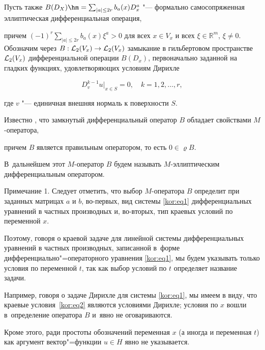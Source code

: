 \begin{enumerate}
Пусть также $B(D_X)\hm =\sum_{|a|\le2r} b_a(x)D_x^a $ "--- формально самосопряженная эллиптическая дифференциальная операция, 

причем $(-1)^r\sum_{|a|\le2r}{b_a(x)\xi^a}>0$ для всех ${x\in V_x}$ и всех ${\xi\in\mathbb{R}^m}$, $\xi\ne0$. Обозначим через $B:{\cal L}_2(V_x)\to{\cal L}_2(V_x)$ замыкание в гильбертовом пространстве ${\cal L}_2(V_x)$ дифференциальной операции $B(D_x)$, первоначально заданной на гладких функциях, удовлетворяющих условиям Дирихле

$$

D_v^{k-1}u\bigr|_{x\in S}=0, \quad k=1,2, \dots,r,

$$

где $v$ "--- единичная внешняя нормаль к поверхности $S$. 

Известно \cite{kor:bib1}, что замкнутый дифференциальный оператор $B$ обладает свойствами $M$-оператора, 

причем $B$ является правильным оператором, то есть $0\in\varrho B$. 

В~дальнейшем этот $M$-оператор $B$ будем называть $M$-эллиптическим дифференциальным оператором.





\end{enumerate}



\smallskip



{\small\sc Примечание 1.} Следует отметить, что выбор $M$-оператора $B$ определит при заданных матрицах $a$ и $b$, во-первых, вид системы \eqref{kor:eq1} дифференциальных уравнений в частных производных и, во-вторых, тип краевых условий по переменной $x.$ 

Поэтому, говоря о краевой задаче для линейной системы дифференциальных уравнений в частных производных, записанной в~форме дифференциально"=операторного уравнения \eqref{kor:eq1}, мы будем указывать только условия по переменной $t$, так как выбор условий по $t$ определяет название задачи. 

Например, говоря о задаче Дирихле для системы \eqref{kor:eq1}, мы имеем в виду, что краевые условия~\eqref{kor:eq2} являются условиями Дирихле; условия по $x$ вошли в~определение оператора $B$ и~явно не оговариваются. 

Кроме этого, ради простоты обозначений переменная $x$ (а иногда и переменная $t$) как аргумент вектор"=функции $u\in H$ явно не указывается.



